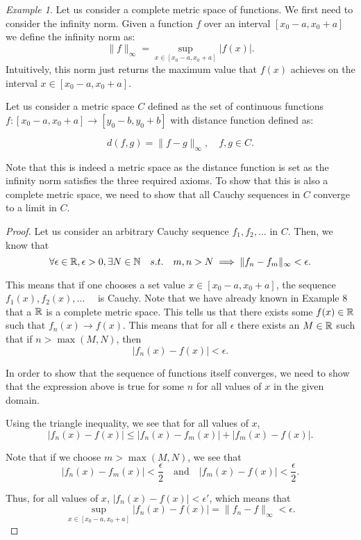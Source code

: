 \documentclass{article}
\theoremstyle{remark}
\newtheorem{example}{Example}
\begin{document}
\begin{example}
 
Let us consider a complete metric space of functions. We first need to consider the infinity norm. Given a function $f$ over an interval $[x_0 -a, x_0+a]$ we define the infinity norm as:
$$\|f\|_{\infty} = \sup_{x\in [x_0 -a, x_0+a]} |f(x)|.$$
Intuitively, this norm just returns the maximum value that $f(x)$ achieves on the interval $x\in [x_0 -a, x_0+a]$.

Let us consider a metric space $C$ defined as the set of continuous functions $f: [x_0 -a, x_0+a] \to [y_0 -b, y_0 +b]$ with distance function defined as:

$$d(f,g) = \|f-g\|_{\infty},\quad f,g \in C.$$


Note that this is indeed a metric space as the distance function is set as the infinity norm satisfies the three required axioms. To show that this is also a complete metric space, we need to show that all Cauchy sequences in $C$ converge to a limit in $C$.

\begin{proof}
    Let us consider an arbitrary Cauchy sequence $f_1, f_2, ... $ in $C$. Then, we know that 
    $$\forall \epsilon \in \Bbb R, \epsilon >0, \exists N \in \Bbb N \quad s.t. \quad m, n> N\implies \|f_n-f_m\|_{\infty} < \epsilon.$$

     This means that if one chooses a set value $x \in [x_0-a, x_0+a]$, the sequence $f_1(x), f_2(x), ... \quad$ is Cauchy.
    Note that we have already known in Example 8 that a $\Bbb R$ is a complete metric space. This tells us that there exists some $f(x) \in \Bbb R$ such that $f_n(x) \to f(x)$. 
    This means that for all $\epsilon$ there exists an $M \in \Bbb R$ such that if $n>\max(M,N)$, then
    $$|f_n(x) - f(x)| < \epsilon.$$

    In order to show that the sequence of functions itself converges, we need to show that the expression above is true for some $n$ for all values of $x$ in the given domain.

    Using the triangle inequality, we see that for all values of $x$, 
    $$|f_n(x) - f(x)| \leq |f_n(x) -  f_m(x)| + |f_m(x) - f(x)|.$$

    Note that if we choose $m > \max(M, N)$, we see that 
    $$|f_n(x) -  f_m(x)| < \frac{\epsilon}{2} \quad  \text{and} \quad |f_m(x) - f(x)| < \frac{\epsilon}{2}.$$

    Thus, for all values of $x$, $|f_n(x) - f(x)| < \epsilon'$, which means that 
    $$\sup_{x\in [x_0 -a, x_0+a]} |f_n(x)-f(x)| = \|f_n-f\|_{\infty} < \epsilon.$$
    

\end{proof}
\end{example}
\end{document}

